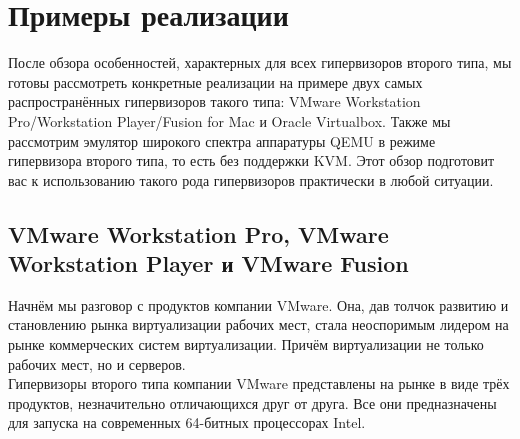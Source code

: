 \documentclass[14pt, a4paper]{article}
\begin{document}
\section*{Примеры реализации}

После обзора особенностей, характерных для всех гипервизоров второго типа, мы готовы
рассмотреть конкретные реализации на примере двух самых распространённых гипервизоров такого
типа: VMware Workstation Pro/Workstation Player/Fusion for Mac и Oracle Virtualbox. Также мы
рассмотрим эмулятор широкого спектра аппаратуры QEMU в режиме гипервизора второго типа, то
есть без поддержки KVM. Этот обзор подготовит вас к использованию такого рода гипервизоров
практически в любой ситуации.

\subsection*{VMware Workstation Pro, VMware Workstation Player и
VMware Fusion}

Начнём мы разговор с продуктов компании VMware. Она, дав толчок развитию и становлению рынка
виртуализации рабочих мест, стала неоспоримым лидером на рынке коммерческих систем
виртуализации. Причём виртуализации не только рабочих мест, но и серверов.\\

Гипервизоры второго типа компании VMware представлены на рынке в виде трёх продуктов,
незначительно отличающихся друг от друга. Все они предназначены для запуска на современных
64-битных процессорах Intel.\\
\end{document}
